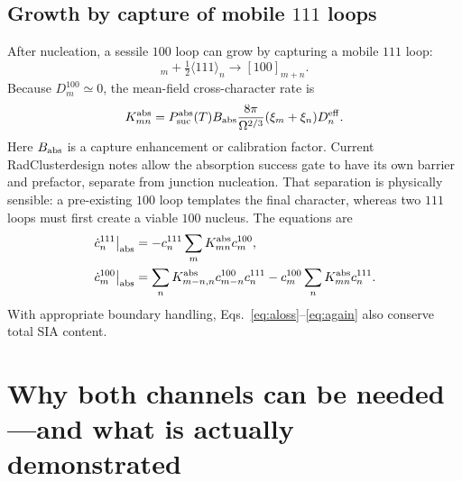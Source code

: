 \documentclass[11pt,a4paper]{article}
\newcommand{\hkl}[1]{\langle #1\rangle}
\newcommand{\half}{\tfrac12}
\newcommand{\rc}{\textsf{RadCluster}}
\begin{document}
\subsection{Growth by capture of mobile $111$ loops}

After nucleation, a sessile $100$ loop can grow by capturing a mobile $111$ loop:
\begin{equation}
 [100]_m+\half\hkl{111}_n\longrightarrow[100]_{m+n}.                   \label{eq:absrxn}
\end{equation}
Because $D_m^{100}\simeq0$, the mean-field cross-character rate is
\begin{equation}
 K_{mn}^{\rm abs}=P_{\rm suc}^{\rm abs}(T)B_{\rm abs}
 \frac{8\pi}{\Omega^{2/3}}(\xi_m+\xi_n)D_n^{\rm eff}.                 \label{eq:absK}
\end{equation}
Here $B_{\rm abs}$ is a capture enhancement or calibration factor.  Current \rc design notes allow the absorption success gate to have its own barrier and prefactor, separate from junction nucleation.  That separation is physically sensible: a pre-existing $100$ loop templates the final character, whereas two $111$ loops must first create a viable $100$ nucleus.  The equations are
\begin{align}
 \left.\dot c_n^{111}\right|_{\rm abs}
 &=-c_n^{111}\sum_mK_{mn}^{\rm abs}c_m^{100},                         \label{eq:aloss}\\
 \left.\dot c_m^{100}\right|_{\rm abs}
 &=\sum_nK_{m-n,n}^{\rm abs}c_{m-n}^{100}c_n^{111}
  -c_m^{100}\sum_nK_{mn}^{\rm abs}c_n^{111}.                          \label{eq:again}
\end{align}
With appropriate boundary handling, Eqs.~\eqref{eq:aloss}--\eqref{eq:again} also conserve total SIA content.

\section{Why both channels can be needed---and what is actually demonstrated}
\end{document}
